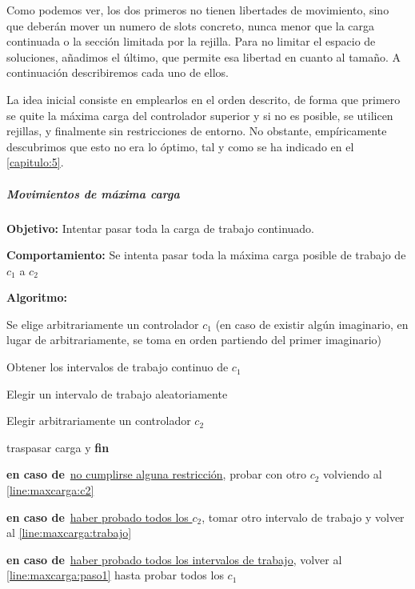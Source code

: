 Como podemos ver, los dos primeros no tienen libertades de movimiento, sino que deberán mover un numero de slots concreto, nunca menor que la carga continuada o la sección limitada por la rejilla. Para no limitar el espacio de soluciones, añadimos el último, que permite esa libertad en cuanto al tamaño. A continuación describiremos cada uno de ellos.

La idea inicial consiste en emplearlos en el orden descrito, de forma que primero se quite la máxima carga del controlador superior y si no es posible, se utilicen rejillas, y finalmente sin restricciones de entorno. No obstante, empíricamente descubrimos que esto no era lo óptimo, tal y como se ha indicado en el \autoref{capitulo:5}.

\subparagraph{Movimientos de máxima carga}
\label{entorno:movMaxCarga}

\textbf{Objetivo:} Intentar pasar toda la carga de trabajo continuado.

\textbf{Comportamiento:} Se intenta pasar toda la máxima carga posible de trabajo de $c_1$ a $c_2$

\textbf{Algoritmo:}
\SetAlgoNoLine
\LinesNumbered
\SetAlgoNoEnd
\DontPrintSemicolon
\begin{algorithm}[h]
    \label{algoritmo:movMaxCarga}
    \SetAlgoNoEnd
    Se elige arbitrariamente un controlador $c_1$ (en caso de existir algún imaginario, en lugar de arbitrariamente, se toma en orden partiendo del primer imaginario) \label{line:maxcarga:paso1}\;
    \algovspace

    Obtener los intervalos de trabajo continuo de $c_1$\;
    \algovspace

    Elegir un intervalo de trabajo aleatoriamente \label{line:maxcarga:trabajo}\;
    \algovspace

    Elegir arbitrariamente un controlador $c_2$ \label{line:maxcarga:c2}\;
    \algovspace

    {traspasar carga y \textbf{fin}}
    \algovspace

    \textbf{en caso de\,} \underline{no cumplirse alguna restricción}, probar con otro $c_2$ volviendo al \autoref{line:maxcarga:c2}\;
    \algovspace

    \textbf{en caso de\,} \underline{haber probado todos los $c_2$}, tomar otro intervalo de trabajo y volver al \autoref{line:maxcarga:trabajo}\;
    \algovspace

    \textbf{en caso de\,} \underline{haber probado todos los intervalos de trabajo}, volver al \autoref{line:maxcarga:paso1} hasta probar todos los $c_1$\;
    \algovspace
\end{algorithm}

